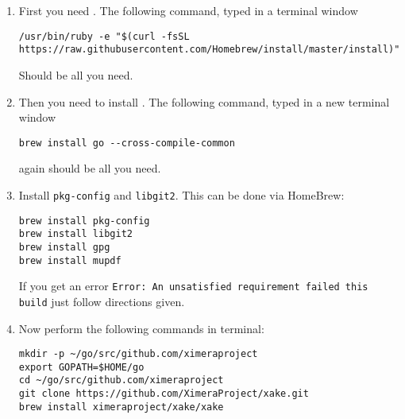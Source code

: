 \documentclass{ximera}
\begin{document}
\begin{enumerate}
\item First you need . The following command, typed in a terminal window
{\pdfOnly{\tiny}
\begin{verbatim}
/usr/bin/ruby -e "$(curl -fsSL https://raw.githubusercontent.com/Homebrew/install/master/install)"
\end{verbatim}
}
Should be all you need. 
\item Then you need to install . The following command, typed in a new terminal window
\begin{verbatim}
brew install go --cross-compile-common
\end{verbatim}
again should be all you need.
\item Install \verb|pkg-config| and \verb|libgit2|. This can be done via HomeBrew:
\begin{verbatim}
brew install pkg-config
brew install libgit2
brew install gpg
brew install mupdf
\end{verbatim}
If you get an error \verb|Error: An unsatisfied requirement failed this build| just follow directions given. 


\item Now perform the following commands in terminal:
\begin{verbatim}
mkdir -p ~/go/src/github.com/ximeraproject
export GOPATH=$HOME/go
cd ~/go/src/github.com/ximeraproject
git clone https://github.com/XimeraProject/xake.git
brew install ximeraproject/xake/xake
\end{verbatim}
\end{enumerate}
\end{document}
